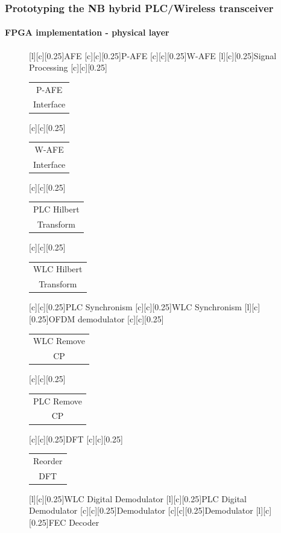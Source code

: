 \documentclass[mathserif]{beamer}
\begin{document}
\begin{frame}
	\frametitle{\normalsize{Prototyping the NB hybrid PLC/Wireless transceiver}}
	\framesubtitle{FPGA implementation - physical layer}	
	\renewcommand{\sizeLetter}{0.3}
	\begin{overprint}
		{
			\renewcommand{\sizeLetter}{0.25}
			\begin{figure}[htb]
				\centering
				[l][c][\sizeLetter]{AFE}
				[c][c][\sizeLetter]{P-AFE}
				[c][c][\sizeLetter]{W-AFE}
				[l][c][\sizeLetter]{Signal Processing}
				[c][c][\sizeLetter]{\begin{tabular}{c}
						P-AFE\\Interface
				\end{tabular}}
				[c][c][\sizeLetter]{\begin{tabular}{c}
						W-AFE\\Interface
				\end{tabular}}
				[c][c][\sizeLetter]{\begin{tabular}{c}
						PLC Hilbert\\Transform
				\end{tabular}}
				[c][c][\sizeLetter]{\begin{tabular}{c}
						WLC Hilbert\\Transform
				\end{tabular}}
				[c][c][\sizeLetter]{PLC Synchronism}
				[c][c][\sizeLetter]{WLC Synchronism}
				[l][c][\sizeLetter]{OFDM demodulator}
				[c][c][\sizeLetter]{\begin{tabular}{c}
						WLC Remove\\CP
				\end{tabular}}
				[c][c][\sizeLetter]{\begin{tabular}{c}
						PLC Remove\\CP
				\end{tabular}}
				[c][c][\sizeLetter]{DFT}
				[c][c][\sizeLetter]{\begin{tabular}{c}
						Reorder\\DFT
				\end{tabular}}
				[l][c][\sizeLetter]{WLC Digital Demodulator}
				[l][c][\sizeLetter]{PLC Digital Demodulator}
				[c][c][\sizeLetter]{Demodulator}
				[c][c][\sizeLetter]{Demodulator}
				[l][c][\sizeLetter]{FEC Decoder}

\end{figure}}
\end{overprint}
\end{frame}
\end{document}
